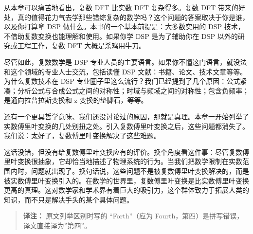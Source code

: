 从本章可以痛苦地看出，复数 DFT 比实数 DFT 复杂得多。复数 DFT
带来的好处，真的值得花力气去学那些错综复杂的数学吗？这个问题的答案取决于你是谁，以及你打算拿
DSP 做什么。本书的一个基本前提是：大多数实用的 DSP
技术，不借助复数变换也能理解和使用。如果你学 DSP 是为了辅助你在 DSP
以外的研究或工程工作，复数 DFT 大概是杀鸡用牛刀。

尽管如此，复数数学是 DSP
专业人员的主要语言。如果你不懂这门语言，就没法和这个领域的专业人士交流，包括读懂
DSP 文献：书籍、论文、技术文章等等。为什么复数技术在 DSP
专业圈子里这么流行？我们已经提到了几个原因：公式紧凑；分析公式与合成公式之间的对称性；时域与频域之间的对称性；包含负频率；是通向拉普拉斯变换和
z 变换的垫脚石，等等。

还有一个更具哲学意味、我们还没讨论过的原因，那就是真理。本章一开始列举了实数傅里叶变换的几处别扭之处。引入复数傅里叶变换之后，这些问题都消失了。我们说：太好了，复数傅里叶变换解决了这些难题。

这话没错，但没有给复数傅里叶变换应有的评价。换个角度看这件事：尽管复数傅里叶变换很抽象，它却恰当地描述了物理系统的行为。当我们把数学限制在实数范围内时，问题就出现了。换句话说，这些问题不是被复数傅里叶变换解决的，而是被实数傅里叶变换引入的。在数学的世界里，复数傅里叶变换是比实数傅里叶变换更高的真理。这对数学家和学术界有着巨大的吸引力，这个群体致力于拓展人类的知识，而不只是解决手头的某个具体问题。

\begin{quote}
\textbf{译注：} 原文列举区别时写的 ``Forth''（应为
Fourth，第四）是拼写错误，译文直接译为''第四''。
\end{quote}
